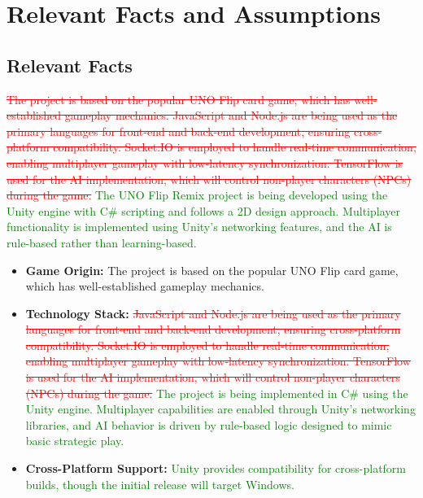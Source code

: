 \documentclass[12pt]{article}
\newcommand{\removed}[1]{\textcolor{red}{\sout{#1}}}
\newcommand{\added}[1]{\textcolor{green}{#1}}
\begin{document}
\section{Relevant Facts and Assumptions}

\subsection{Relevant Facts}
\removed{The project is based on the popular UNO Flip card game, which has well-established gameplay mechanics. JavaScript and Node.js are being used as the primary languages for front-end and back-end development, ensuring cross-platform compatibility. Socket.IO is employed to handle real-time communication, enabling multiplayer gameplay with low-latency synchronization. TensorFlow is used for the AI implementation, which will control non-player characters (NPCs) during the game.}
\added{The UNO Flip Remix project is being developed using the Unity engine with C\# scripting and follows a 2D design approach. Multiplayer functionality is implemented using Unity’s networking features, and the AI is rule-based rather than learning-based.}

\begin{itemize}
    \item \textbf{Game Origin:} The project is based on the popular UNO Flip card game, which has well-established gameplay mechanics.
    \item \textbf{Technology Stack:} \removed{JavaScript and Node.js are being used as the primary languages for front-end and back-end development, ensuring cross-platform compatibility. Socket.IO is employed to handle real-time communication, enabling multiplayer gameplay with low-latency synchronization. TensorFlow is used for the AI implementation, which will control non-player characters (NPCs) during the game.}
    \added{The project is being implemented in C\# using the Unity engine. Multiplayer capabilities are enabled through Unity's networking libraries, and AI behavior is driven by rule-based logic designed to mimic basic strategic play.}
    \item \textbf{Cross-Platform Support:} \added{Unity provides compatibility for cross-platform builds, though the initial release will target Windows.}
\end{itemize}
\end{document}
